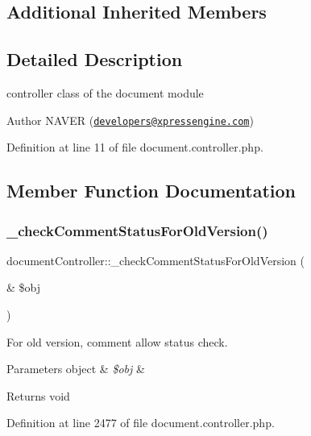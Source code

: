 \subsection*{Additional Inherited Members}


\subsection{Detailed Description}
controller class of the document module 

\begin{DoxyAuthor}{Author}
N\+A\+V\+ER (\href{mailto:developers@xpressengine.com}{\tt developers@xpressengine.\+com}) 
\end{DoxyAuthor}


Definition at line 11 of file document.\+controller.\+php.



\subsection{Member Function Documentation}
\mbox{\label{classdocumentController_a3fad5f9653c0ca05bcb1a63a24c318cf}} 
\subsubsection{\texorpdfstring{\+\_\+check\+Comment\+Status\+For\+Old\+Version()}{\_checkCommentStatusForOldVersion()}}
{\footnotesize\ttfamily document\+Controller\+::\+\_\+check\+Comment\+Status\+For\+Old\+Version (\begin{DoxyParamCaption}\item[{\&}]{\$obj }\end{DoxyParamCaption})}

For old version, comment allow status check. 
\begin{DoxyParams}[1]{Parameters}
object & {\em \$obj} & \\
\hline
\end{DoxyParams}
\begin{DoxyReturn}{Returns}
void 
\end{DoxyReturn}


Definition at line 2477 of file document.\+controller.\+php.

